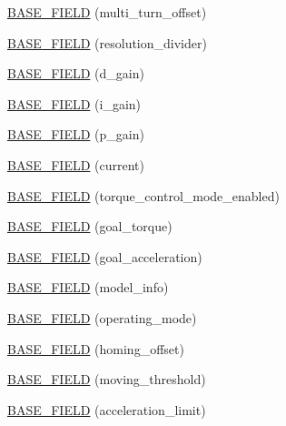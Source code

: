 \begin{DoxyCompactItemize}
\item 
\hyperlink{classdynamixel_1_1servos_1_1_base_servo_aa57f1bf9f68d5ff6bbee12ad9de25f03}{B\+A\+S\+E\+\_\+\+F\+I\+E\+L\+D} (multi\+\_\+turn\+\_\+offset)
\item 
\hyperlink{classdynamixel_1_1servos_1_1_base_servo_a046123a7102b0f8576a5379244dab59f}{B\+A\+S\+E\+\_\+\+F\+I\+E\+L\+D} (resolution\+\_\+divider)
\item 
\hyperlink{classdynamixel_1_1servos_1_1_base_servo_a2faa22f6a3eb0ec3e01e4ca427f11ddd}{B\+A\+S\+E\+\_\+\+F\+I\+E\+L\+D} (d\+\_\+gain)
\item 
\hyperlink{classdynamixel_1_1servos_1_1_base_servo_a2f96570d1a8c874bc38bfe53c19d6bba}{B\+A\+S\+E\+\_\+\+F\+I\+E\+L\+D} (i\+\_\+gain)
\item 
\hyperlink{classdynamixel_1_1servos_1_1_base_servo_a49e5eeb24d2f0a56e6450dffd8bd6d9c}{B\+A\+S\+E\+\_\+\+F\+I\+E\+L\+D} (p\+\_\+gain)
\item 
\hyperlink{classdynamixel_1_1servos_1_1_base_servo_a3e081b1577bbe5571cfcf277ebaeb90a}{B\+A\+S\+E\+\_\+\+F\+I\+E\+L\+D} (current)
\item 
\hyperlink{classdynamixel_1_1servos_1_1_base_servo_a828703bacd6f83b91a4c4bbe7cb45d7e}{B\+A\+S\+E\+\_\+\+F\+I\+E\+L\+D} (torque\+\_\+control\+\_\+mode\+\_\+enabled)
\item 
\hyperlink{classdynamixel_1_1servos_1_1_base_servo_af4433354d94851217d5931b528be26a1}{B\+A\+S\+E\+\_\+\+F\+I\+E\+L\+D} (goal\+\_\+torque)
\item 
\hyperlink{classdynamixel_1_1servos_1_1_base_servo_a87f4340b3d3c266be54fe22cb0573128}{B\+A\+S\+E\+\_\+\+F\+I\+E\+L\+D} (goal\+\_\+acceleration)
\item 
\hyperlink{classdynamixel_1_1servos_1_1_base_servo_a534b4f6823ed8c8c2e2b650d76aef90a}{B\+A\+S\+E\+\_\+\+F\+I\+E\+L\+D} (model\+\_\+info)
\item 
\hyperlink{classdynamixel_1_1servos_1_1_base_servo_afe1a1fd0d8a3195fc053186729e493d7}{B\+A\+S\+E\+\_\+\+F\+I\+E\+L\+D} (operating\+\_\+mode)
\item 
\hyperlink{classdynamixel_1_1servos_1_1_base_servo_a3feb535f2ec0d53f4b8dbb873e78875a}{B\+A\+S\+E\+\_\+\+F\+I\+E\+L\+D} (homing\+\_\+offset)
\item 
\hyperlink{classdynamixel_1_1servos_1_1_base_servo_ae380e8c4a76f8377bdb7112b3ad3fa68}{B\+A\+S\+E\+\_\+\+F\+I\+E\+L\+D} (moving\+\_\+threshold)
\item 
\hyperlink{classdynamixel_1_1servos_1_1_base_servo_a17a48b48ed6277f17477656977c373e3}{B\+A\+S\+E\+\_\+\+F\+I\+E\+L\+D} (acceleration\+\_\+limit)

\end{DoxyCompactItemize}
